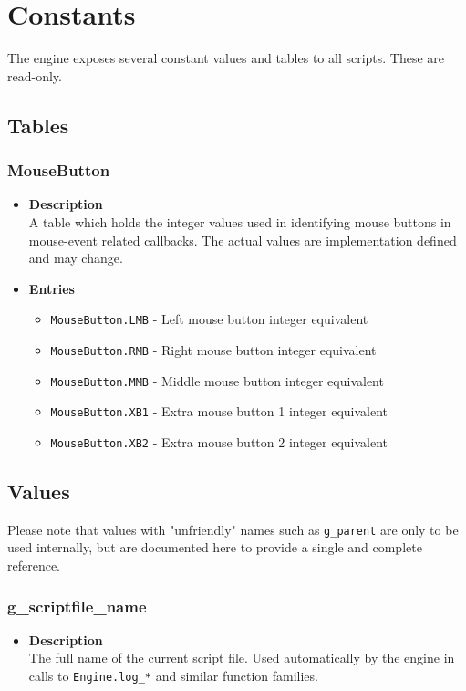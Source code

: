 \documentclass[12pt,a4paper]{article}
\begin{document}
\pagebreak
\section{Constants}

The engine exposes several constant values and tables to all scripts. These are read-only.
\subsection{Tables}

\subsubsection{MouseButton}

\begin{itemize}
	\item[]{\bf Description}
		\\ A table which holds the integer values used in identifying mouse buttons in mouse-event related callbacks. The actual values are implementation defined and may change.
	\item[]{\bf Entries}
\begin{itemize}
	\item{\texttt{MouseButton.LMB}} - Left mouse button integer equivalent
	\item{\texttt{MouseButton.RMB}} - Right mouse button integer equivalent
	\item{\texttt{MouseButton.MMB}} - Middle mouse button integer equivalent
	\item{\texttt{MouseButton.XB1}} - Extra mouse button 1 integer equivalent
	\item{\texttt{MouseButton.XB2}} - Extra mouse button 2 integer equivalent
	
\end{itemize}
\end{itemize}

\subsection{Values}

Please note that values with "unfriendly" names such as \texttt{g\_parent} are only to be used internally, but are documented here to provide a single and complete reference.

\subsubsection{g\_scriptfile\_name}
\begin{itemize}
	\item[]{\bf Description}
		\\ The full name of the current script file. Used automatically by the engine in calls to \texttt{Engine.log\_*} and similar function families.
\end{itemize}
\end{document}
